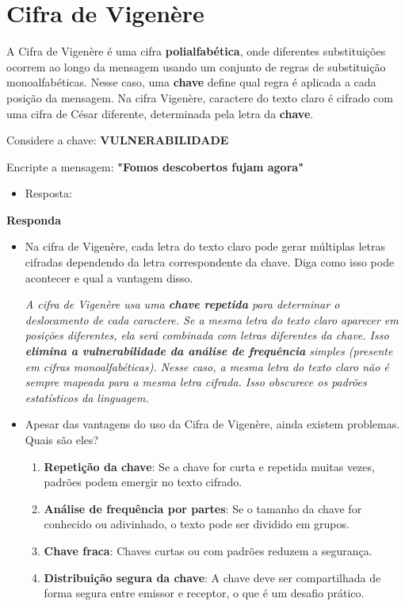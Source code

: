 \section{Cifra de Vigenère}

A Cifra de Vigenère é uma cifra \textbf{polialfabética}, onde diferentes substituições ocorrem ao longo da mensagem usando um conjunto de regras de substituição monoalfabéticas. Nesse caso, uma \textbf{chave} define qual regra é aplicada a cada posição da mensagem. Na cifra Vigenère, caractere do texto claro é cifrado com uma cifra de César diferente, determinada pela letra da \textbf{chave}.

Considere a chave: \textbf{VULNERABILIDADE}

Encripte a mensagem: \textbf{"Fomos descobertos fujam agora"}

\begin{itemize}
    \item Resposta: 
\end{itemize}


\textbf{Responda}
\begin{itemize}
    \item Na cifra de Vigenère, cada letra do texto claro pode gerar múltiplas letras cifradas dependendo da letra correspondente da chave. Diga como isso pode acontecer e qual a vantagem disso.

          \textit{A cifra de Vigenère usa uma \textbf{chave repetida} para determinar o deslocamento de cada caractere. Se a mesma letra do texto claro aparecer em posições diferentes, ela será combinada com letras diferentes da chave.  Isso \textbf{elimina a vulnerabilidade da análise de frequência} simples (presente em cifras monoalfabéticas). Nesse caso, a mesma letra do texto claro não é sempre mapeada para a mesma letra cifrada. Isso obscurece os padrões estatísticos da linguagem.}

    \item Apesar das vantagens do uso da Cifra de Vigenère, ainda existem problemas. Quais são eles?
          \begin{enumerate}
              \item \textbf{Repetição da chave}: Se a chave for curta e repetida muitas vezes, padrões podem emergir no texto cifrado.
              \item \textbf{Análise de frequência por partes}: Se o tamanho da chave for conhecido ou adivinhado, o texto pode ser dividido em grupos.
              \item \textbf{Chave fraca}: Chaves curtas ou com padrões reduzem a segurança.
              \item \textbf{Distribuição segura da chave}: A chave deve ser compartilhada de forma segura entre emissor e receptor, o que é um desafio prático.
          \end{enumerate}


\end{itemize}

